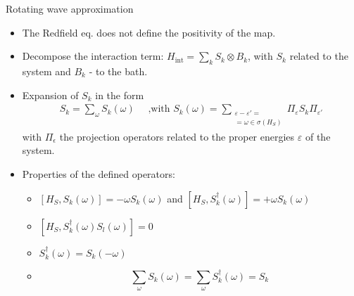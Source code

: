 \documentclass[10pt,xcolor={table,dvipsnames},t]{beamer}
\newcommand{\Hint}{H_{\text{int}}}
\begin{document}
\begin{frame}{Rotating wave approximation}
  \begin{itemize}
    \item<1-> The Redfield eq. does not define the positivity of the map.
    \item<2-> Decompose the interaction term: $\Hint = \sum_k S_k \otimes B_k$, with $S_k$ related to 
      the system and $B_k$ - to the bath.
    \item<3-> Expansion of $S_k$ in the form 
      \begin{equation}
        \begin{split}
          S_k = \sum_\omega S_k(\omega) \quad \text{ ,with } S_k(\omega) = 
          \sum_{\substack{\varepsilon - \varepsilon'=\\ =\omega \in \sigma(H_S)}}\Pi_\varepsilon S_k \Pi_{\varepsilon'} 
      \end{split}
      \end{equation}
      with $\Pi_\epsilon$ the projection operators related to the proper energies $\varepsilon$ of the system.
    \item<4-> Properties of the defined operators: 
      \begin{itemize}
        \item<4-> $[H_S, S_k(\omega)]=-\omega S_k(\omega)$ \quad 
          and \quad $[H_S, S_k^\dag(\omega)]= +\omega S_k(\omega)$
        \item<4-> $[H_S, S_k^\dag(\omega) S_l(\omega)]=0$
        \item<4-> $S_k^\dag(\omega)=S_k(-\omega)$
        \item<4->
          \begin{equation}
            \sum_\omega S_k(\omega) = \sum_\omega S^\dag_k(\omega) = S_k
          \end{equation}
      \end{itemize}
  \end{itemize}
\end{frame}
\end{document}
